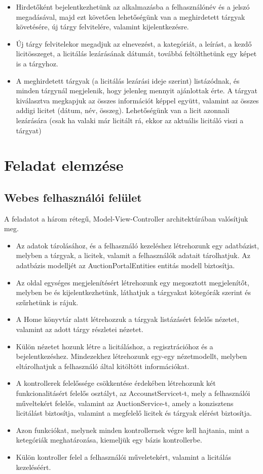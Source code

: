 \documentclass[12pt,a4paper]{article}
\begin{document}
\begin{itemize}
\item Hirdetőként bejelentkezhetünk az alkalmazásba a felhasználónév és a jelszó megadásával, majd ezt követően lehetőségünk van a meghirdetett tárgyak követésére, új tárgy felvitelére, valamint kijelentkezésre.
\item Új tárgy felvitelekor megadjuk az elnevezést, a kategóriát, a leírást, a kezdő licitösszeget, a licitálás lezárásának dátumát, továbbá feltölthetünk egy képet is a tárgyhoz.
\item A  meghirdetett  tárgyak  (a  licitálás  lezárási  ideje  szerint)  listázódnak,  és minden tárgynál megjelenik, hogy jelenleg mennyit ajánlottak 
érte. A tárgyat kiválasztva  megkapjuk  az  összes  információt  képpel  együtt,  valamint  az összes addigi licitet (dátum, név, összeg). Lehetőségünk van a licit azonnali lezárására (csak ha valaki már licitált rá, ekkor az aktuális licitáló viszi a tárgyat)

\end{itemize}

\section{Feladat elemzése}
\subsection{Webes felhasználói felület}
A feladatot a három rétegű, Model-View-Controller architektúrában valósítjuk meg.
\begin{itemize}
\item Az adatok tárolásához, és a felhasználó kezeléshez létrehozunk egy adatbázist, melyben a tárgyak, a licitek, valamit a felhasználók adatait tárolhatjuk. Az adatbázis modelljét az AuctionPortalEntities entitás modell biztosítja.
\item Az oldal egységes megjelenítésért létrehozunk egy megosztott megjelenítőt, melyben be és kijelentkezhetünk, láthatjuk a tárgyakat kötegórák szerint és szűrhetünk is rájuk.
\item A Home könyvtár alatt létrehozzuk a tárgyak listázásért felelős nézetet, valamint az adott tárgy részletei nézetet.
\item Külön nézetet hozunk létre a licitáláshoz, a regisztrációhoz és a bejelentkezéshez. Mindezekhez létrehozunk egy-egy nézetmodellt, melyben eltárolhatjuk a felhasználó által kitöltött információkat.
\item A kontrollerek felelőssége csökkentése érdekében létrehozunk két funkcionalitásért felelős osztályt, az AccounstServicet-t, mely a felhasználói műveltekért felelős, valamint az AuctionService-t, amely a konzisztens licitálást biztosítja, valamint a megfelelő licitek és tárgyak elérést biztosítja.
\item Azon funkciókat, melynek minden kontrollernek  végre kell hajtania, mint a ketegóriák meghatározása, kiemeljük egy bázis kontrollerbe.
\item Külön kontroller felel a felhasználói műveletekért, valamint a licitálás kezeléséért.
\end{itemize}
\end{document}
